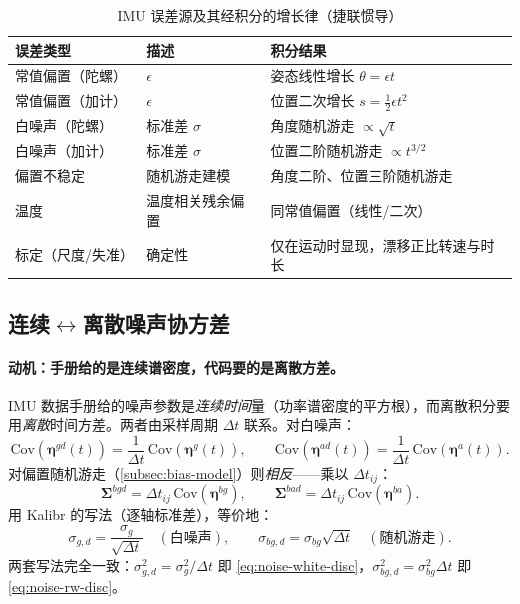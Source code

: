 \begin{table}[H]\centering\small
\caption{IMU 误差源及其经积分的增长律（捷联惯导\cite{woodman2007inertial}）}
\label{tab:imu-error-sources}
\begin{tabular}{lll}
\toprule
误差类型 & 描述 & 积分结果 \\
\midrule
常值偏置（陀螺）& $\epsilon$ & 姿态线性增长 $\theta=\epsilon t$ \\
常值偏置（加计）& $\epsilon$ & 位置二次增长 $s=\tfrac12\epsilon t^2$ \\
白噪声（陀螺）& 标准差 $\sigma$ & 角度随机游走 $\propto\sqrt t$ \\
白噪声（加计）& 标准差 $\sigma$ & 位置二阶随机游走 $\propto t^{3/2}$ \\
偏置不稳定 & 随机游走建模 & 角度二阶、位置三阶随机游走 \\
温度 & 温度相关残余偏置 & 同常值偏置（线性/二次） \\
标定（尺度/失准）& 确定性 & 仅在运动时显现，漂移正比转速与时长 \\
\bottomrule
\end{tabular}
\end{table}

\subsection{连续\texorpdfstring{$\leftrightarrow$}{<->}离散噪声协方差}
\label{subsec:cont-disc-noise}

\paragraph{动机：手册给的是连续谱密度，代码要的是离散方差。}
IMU 数据手册给的噪声参数是\emph{连续时间}量（功率谱密度的平方根），而离散积分要用\emph{离散}时间方差。两者由采样周期 $\Delta t$ 联系。对白噪声\cite{forster2017preintegration,rehder2016kalibr}：
\begin{equation}
  \mathrm{Cov}(\boldsymbol\eta^{gd}(t))=\frac{1}{\Delta t}\,\mathrm{Cov}(\boldsymbol\eta^{g}(t)),\qquad
  \mathrm{Cov}(\boldsymbol\eta^{ad}(t))=\frac{1}{\Delta t}\,\mathrm{Cov}(\boldsymbol\eta^{a}(t)).
  \label{eq:noise-white-disc}
\end{equation}
对偏置随机游走（\cref{subsec:bias-model}）则\emph{相反}——乘以 $\Delta t_{ij}$：
\begin{equation}
  \boldsymbol\Sigma^{bgd}=\Delta t_{ij}\,\mathrm{Cov}(\boldsymbol\eta^{bg}),\qquad
  \boldsymbol\Sigma^{bad}=\Delta t_{ij}\,\mathrm{Cov}(\boldsymbol\eta^{ba}).
  \label{eq:noise-rw-disc}
\end{equation}
用 Kalibr 的写法（逐轴标准差）\cite{rehder2016kalibr}，等价地：
\begin{equation}
  \sigma_{g,d}=\frac{\sigma_g}{\sqrt{\Delta t}}\quad(\text{白噪声}),\qquad
  \sigma_{bg,d}=\sigma_{bg}\sqrt{\Delta t}\quad(\text{随机游走}).
  \label{eq:kalibr-conv}
\end{equation}
两套写法完全一致：$\sigma_{g,d}^2=\sigma_g^2/\Delta t$ 即 \cref{eq:noise-white-disc}，$\sigma_{bg,d}^2=\sigma_{bg}^2\Delta t$ 即 \cref{eq:noise-rw-disc}。

